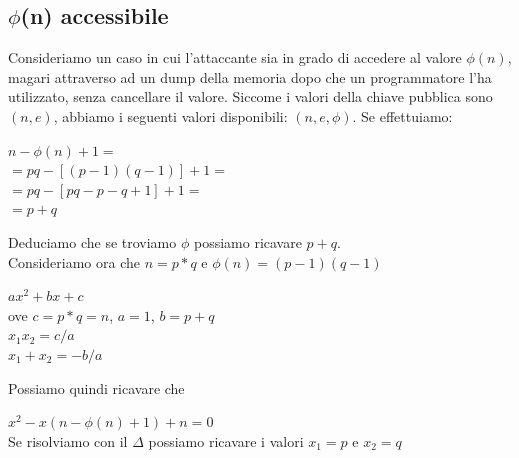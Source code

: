 \documentclass[11pt, oneside]{article}   	%
\begin{document}
\subsection*{$\phi$(n) accessibile}
Consideriamo un caso in cui l'attaccante sia in grado di accedere al valore $\phi(n)$, magari attraverso ad un dump della memoria dopo che un programmatore l'ha utilizzato, senza cancellare il valore. Siccome i valori della chiave pubblica sono $(n, e)$, abbiamo i seguenti valori disponibili: $(n, e, \phi)$. Se effettuiamo:
\begin{center}
$n-\phi(n)+1 =$\\
$=pq-[(p-1)(q-1)]+1=$\\
$=pq-[pq-p-q+1]+1=$\\
$=p+q$
\end{center}
Deduciamo che se troviamo $\phi$ possiamo ricavare $p+q$. \\Consideriamo ora che $n=p*q$ e $\phi(n) = (p-1)(q-1)$
\begin{center}
$ax^2+bx+c$ \\ove $c = p*q = n$, $a =1$, $b = p+q$\\
$x_1x_2 = c/a$\\
$x_1+x_2 = -b/a$
\end{center}
Possiamo quindi ricavare che\begin{center}
$x^2-x(n-\phi(n)+1)+n=0$\\
Se risolviamo con il $\Delta$ possiamo ricavare i valori $x_1 = p $ e $x_2 = q$
\end{center}

\long{}
\end{document}
